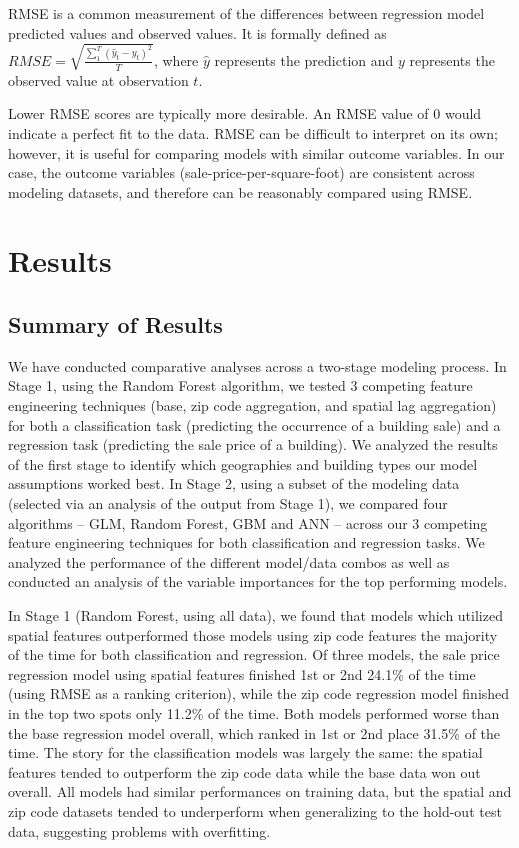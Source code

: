 \documentclass[conference,final,]{IEEEtran}
\begin{document}
RMSE is a common measurement of the differences between regression model
predicted values and observed values. It is formally defined as
\(RMSE = \sqrt{ \frac{\sum_{1}^{T} (\hat{y}_t - y_t)^2}{T} }\), where
\(\hat{y}\) represents the prediction and \(y\) represents the observed
value at observation \(t\).

Lower RMSE scores are typically more desirable. An RMSE value of 0 would
indicate a perfect fit to the data. RMSE can be difficult to interpret
on its own; however, it is useful for comparing models with similar
outcome variables. In our case, the outcome variables
(sale-price-per-square-foot) are consistent across modeling datasets,
and therefore can be reasonably compared using RMSE.

\hypertarget{results}{%
\section{Results}\label{results}}

\hypertarget{summary-of-results}{%
\subsection{Summary of Results}\label{summary-of-results}}

We have conducted comparative analyses across a two-stage modeling
process. In Stage 1, using the Random Forest algorithm, we tested 3
competing feature engineering techniques (base, zip code aggregation,
and spatial lag aggregation) for both a classification task (predicting
the occurrence of a building sale) and a regression task (predicting the
sale price of a building). We analyzed the results of the first stage to
identify which geographies and building types our model assumptions
worked best. In Stage 2, using a subset of the modeling data (selected
via an analysis of the output from Stage 1), we compared four algorithms
-- GLM, Random Forest, GBM and ANN -- across our 3 competing feature
engineering techniques for both classification and regression tasks. We
analyzed the performance of the different model/data combos as well as
conducted an analysis of the variable importances for the top performing
models.

In Stage 1 (Random Forest, using all data), we found that models which
utilized spatial features outperformed those models using zip code
features the majority of the time for both classification and
regression. Of three models, the sale price regression model using
spatial features finished 1st or 2nd 24.1\% of the time (using RMSE as a
ranking criterion), while the zip code regression model finished in the
top two spots only 11.2\% of the time. Both models performed worse than
the base regression model overall, which ranked in 1st or 2nd place
31.5\% of the time. The story for the classification models was largely
the same: the spatial features tended to outperform the zip code data
while the base data won out overall. All models had similar performances
on training data, but the spatial and zip code datasets tended to
underperform when generalizing to the hold-out test data, suggesting
problems with overfitting.
\end{document}
